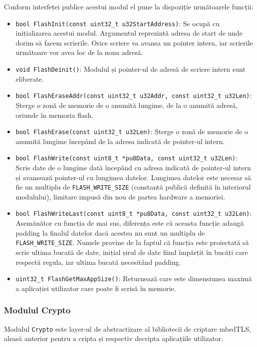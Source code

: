 \documentclass[12pt,a4paper,titlepage]{report}
\begin{document}
Conform interfeței publice acestui modul el pune la dispoziție următoarele funcții:
\begin{itemize}
\item \texttt{bool FlashInit(const uint32\_t u32StartAddress)}: Se ocupă cu inițializarea acestui modul. Argumentul reprezintă adresa de start de unde dorim să facem scrierile. Orice scriere va avansa un pointer intern, iar scrierile următoare vor avea loc de la noua adresă.
\item \texttt{void FlashDeinit()}: Modulul și pointer-ul de adresă de scriere intern sunt eliberate.
\item \texttt{bool FlashEraseAddr(const uint32\_t u32Addr, const uint32\_t u32Len)}: Șterge o zonă de memorie de o anumită lungime, de la o anumită adresă, oriunde în memoria flash.
\item \texttt{bool FlashErase(const uint32\_t u32Len)}: Șterge o zonă de memorie de o anumită lungime începând de la adresa indicată de pointer-ul intern.
\item \texttt{bool FlashWrite(const uint8\_t *pu8Data, const uint32\_t u32Len)}: Scrie date de o lungime dată începând cu adresa indicată de pointer-ul intern și avansează pointer-ul cu lungimea datelor. Lungimea datelor este necesar să fie un multiplu de \texttt{FLASH\_WRITE\_SIZE} (constantă publică definită în interiorul modulului), limitare impusă din nou de partea hardware a memoriei. 
\item \texttt{bool FlashWriteLast(const uint8\_t *pu8Data, const uint32\_t u32Len)}: Asemănător cu funcția de mai sus, diferența este că aceasta funcție adaugă padding la finalul datelor dacă acestea nu sunt un multiplu de \texttt{FLASH\_WRITE\_SIZE}. Numele provine de la faptul că funcția este proiectată să scrie ultima bucată de date, inițial șirul de date fiind împărțit în bucăți care respectă regula, iar ultima bucată necesitând padding.
\item \texttt{uint32\_t FlashGetMaxAppSize()}: Returnează care este dimensiunea maximă a aplicației utilizator care poate fi scrisă în memorie.
\end{itemize}

\subsubsection{Modulul Crypto}
Modulul \texttt{Crypto} este layer-ul de abstractizare al bibliotecii de criptare mbedTLS, aleasă anterior pentru a cripta și respectiv decripta aplicațiile utilizator.
\end{document}

